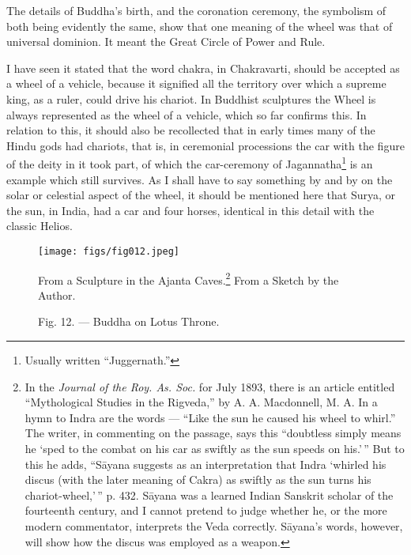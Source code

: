 \documentclass[a4paper, 11pt, oneside, polutonikogreek, english]{article}
\begin{document}
The details of Buddha's birth, and the coronation ceremony, the symbolism of both being evidently the same, show that one meaning of the wheel was that of universal dominion. It meant the Great Circle of Power and Rule.

I have seen it stated that the word chakra, in Chakravarti, should be accepted as a wheel of a vehicle, because it signified all the territory over which a supreme king, as a ruler, could drive his chariot. In Buddhist sculptures the Wheel is always represented as the wheel of a vehicle, which so far confirms this. In relation to this, it should also be recollected that in early times many of the Hindu gods had chariots, that is, in ceremonial processions the car with the figure of the deity in it took part, of which the car-ceremony of Jagannatha\footnote{Usually written ``Juggernath.''} is an example which still survives. As I shall have to say something by and by on the solar or celestial aspect of the wheel, it should be mentioned here that Surya, or the sun, in India, had a car and four horses, identical in this detail with the classic Helios.

\begin{figure}[H]
\centering
\texttt{[image: figs/fig012.jpeg]}
\caption{Fig. 12. --- Buddha on Lotus Throne.}

From a Sculpture in the Ajanta Caves.\footnote{In the \emph{Journal of the Roy. As. Soc.} for July 1893, there is an article entitled ``Mythological Studies in the Rigveda,'' by A. A. Macdonnell, M. A. In a hymn to Indra are the words --- ``Like the sun he caused his wheel to whirl.'' The writer, in commenting on the passage, says this ``doubtless simply means he `sped to the combat on his car as swiftly as the sun speeds on his.'\,'' But to this he adds, ``Sāyana suggests as an interpretation that Indra `whirled his discus (with the later meaning of Cakra) as swiftly as the sun turns his chariot-wheel,'\,'' p. 432. Sāyana was a learned Indian Sanskrit scholar of the fourteenth century, and I cannot pretend to judge whether he, or the more modern commentator, interprets the Veda correctly. Sāyana's words, however, will show how the discus was employed as a weapon.} From a Sketch by the Author.
\end{figure}
\end{document}
